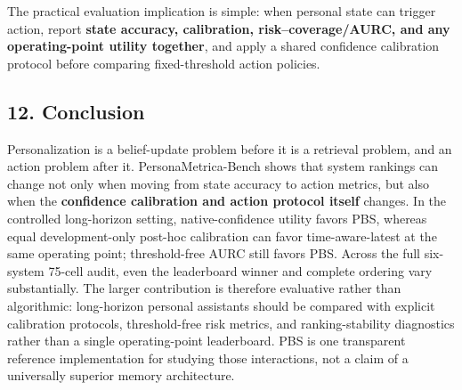 The practical evaluation implication is simple: when personal state can
trigger action, report \textbf{state accuracy, calibration,
risk--coverage/AURC, and any operating-point utility together}, and
apply a shared confidence calibration protocol before comparing
fixed-threshold action policies.

\subsection{12. Conclusion}\label{conclusion}

Personalization is a belief-update problem before it is a retrieval
problem, and an action problem after it. PersonaMetrica-Bench shows that
system rankings can change not only when moving from state accuracy to
action metrics, but also when the \textbf{confidence calibration and
action protocol itself} changes. In the controlled long-horizon setting,
native-confidence utility favors PBS, whereas equal development-only
post-hoc calibration can favor time-aware-latest at the same operating
point; threshold-free AURC still favors PBS. Across the full six-system
75-cell audit, even the leaderboard winner and complete ordering vary
substantially. The larger contribution is therefore evaluative rather
than algorithmic: long-horizon personal assistants should be compared
with explicit calibration protocols, threshold-free risk metrics, and
ranking-stability diagnostics rather than a single operating-point
leaderboard. PBS is one transparent reference implementation for
studying those interactions, not a claim of a universally superior
memory architecture.
